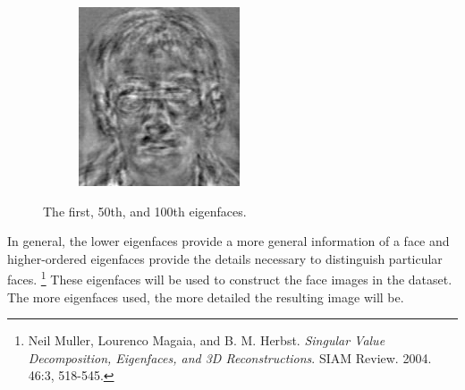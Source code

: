 \begin{figure}[H]
\begin{subfigure}{.32\textwidth}
\end{subfigure}
%
\begin{subfigure}{.32\textwidth}
    \centering
    \includegraphics[width=\textwidth]{figures/eigenface99.png}
\end{subfigure}
\caption{The first, 50th, and 100th eigenfaces.}
\label{fig:facerec-eigenfaces}
\end{figure}

In general, the lower eigenfaces provide a more general information of a face and higher-ordered eigenfaces provide the details necessary to distinguish particular faces.%
\footnote{Neil Muller, Lourenco Magaia, and B. M. Herbst. \textit{Singular Value Decomposition, Eigenfaces, and 3D Reconstructions}. SIAM Review. 2004. 46:3, 518-545.}
These eigenfaces will be used to construct the face images in the dataset.
The more eigenfaces used, the more detailed the resulting image will be.

